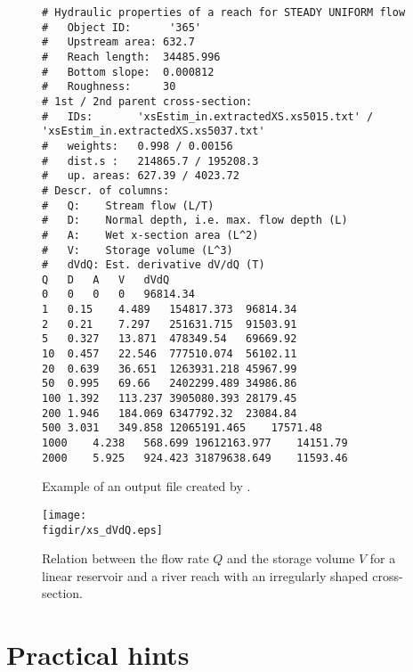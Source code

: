 \begin{figure*}
\begin{lstlisting}[style=txt]
# Hydraulic properties of a reach for STEADY UNIFORM flow
#   Object ID:      '365'
#   Upstream area: 632.7
#   Reach length:  34485.996
#   Bottom slope:  0.000812
#   Roughness:     30
# 1st / 2nd parent cross-section:
#   IDs:       'xsEstim_in.extractedXS.xs5015.txt' / 'xsEstim_in.extractedXS.xs5037.txt'
#   weights:   0.998 / 0.00156
#   dist.s :   214865.7 / 195208.3
#   up. areas: 627.39 / 4023.72
# Descr. of columns:
#   Q:    Stream flow (L/T)
#   D:    Normal depth, i.e. max. flow depth (L)
#   A:    Wet x-section area (L^2)
#   V:    Storage volume (L^3)
#   dVdQ: Est. derivative dV/dQ (T)
Q	D	A	V	dVdQ
0	0	0	0	96814.34
1	0.15	4.489	154817.373	96814.34
2	0.21	7.297	251631.715	91503.91
5	0.327	13.871	478349.54	69669.92
10	0.457	22.546	777510.074	56102.11
20	0.639	36.651	1263931.218	45967.99
50	0.995	69.66	2402299.489	34986.86
100	1.392	113.237	3905080.393	28179.45
200	1.946	184.069	6347792.32	23084.84
500	3.031	349.858	12065191.465	17571.48
1000	4.238	568.699	19612163.977	14151.79
2000	5.925	924.423	31879638.649	11593.46
\end{lstlisting}
\caption{Example of an output file created by . \label{fig:topocatch:xsregio:output}}
\end{figure*}

\begin{figure}
  \centering
  \texttt{[image: \\figdir/xs\_dVdQ.eps]}
  \caption{Relation between the flow rate $Q$ and the storage volume $V$ for a linear reservoir and a river reach with an irregularly shaped cross-section. \label{fig:topocatch:xsregio:dVdQ}}
\end{figure}

\section{Practical hints} \label{sec:topocatch:hints}

